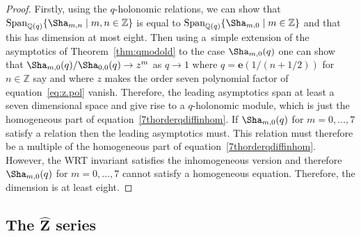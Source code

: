 \documentclass[pdftex]{sigma}
\numberwithin{equation}{section}
\def\BZ{\mathbb{Z}}
\def\BQ{\mathbb{Q}}
\def\e{\mathbf e}
\def\WRT{\Sha}
\def\BZ{\mathbb Z}
\def\BQ{\mathbb Q}
\begin{document}
\begin{proof}
Firstly, using the $q$-holonomic relations, we can show that $\mathrm{Span}_{\BQ(q)}\{\WRT_{m,n}\mid m,n\in\BZ\}$ is equal to $\mathrm{Span}_{\BQ(q)}\{\WRT_{m,0}\mid m\in\BZ\}$ and that this has dimension at most eight. Then using a~simple extension of the asymptotics of Theorem~\ref{thm:qmodold} to the case $\WRT_{m,0}(q)$ one can show that $\WRT_{m,0}(q)/\WRT_{0,0}(q)\rightarrow z^m$ as $q\rightarrow 1$ where $q=\e(1/(n+1/2))$ for $n\in\BZ$ say and where $z$ makes the order seven polynomial factor of equation~\eqref{eq:z.pol} vanish. Therefore, the leading asymptotics span at least a seven dimensional space and give rise to a $q$-holonomic module, which is just the homogeneous part of equation~\eqref{7thorderqdiffinhom}. If $\WRT_{m,0}(q)$ for $m=0,\dots,7$ satisfy a relation then the leading asymptotics must. This relation must therefore be a multiple of the homogeneous part of equation~\eqref{7thorderqdiffinhom}. However, the WRT invariant satisfies the inhomogeneous version and therefore $\WRT_{m,0}(q)$ for $m=0,\dots,7$ cannot satisfy a homogeneous equation. Therefore, the dimension is at least eight.
\end{proof}

\subsection[The $\widehat{Z}$ series]{The $\boldsymbol{\widehat{Z}}$ series}
\end{document}

